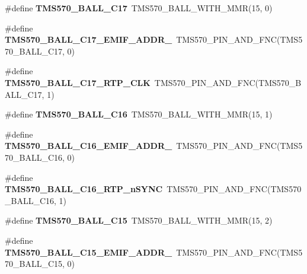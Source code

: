\begin{DoxyCompactItemize}
\#define {\bfseries T\+M\+S570\+\_\+\+B\+A\+L\+L\+\_\+\+C17}~T\+M\+S570\+\_\+\+B\+A\+L\+L\+\_\+\+W\+I\+T\+H\+\_\+\+M\+MR(15, 0)
\item 
\mbox{\label{tms570ls3137zwt-pins_8h_a05c4cd325eded595ce31f3a138ee33ba}} 
\#define {\bfseries T\+M\+S570\+\_\+\+B\+A\+L\+L\+\_\+\+C17\+\_\+\+E\+M\+I\+F\+\_\+\+A\+D\+D\+R\+\_}~T\+M\+S570\+\_\+\+P\+I\+N\+\_\+\+A\+N\+D\+\_\+\+F\+NC(T\+M\+S570\+\_\+\+B\+A\+L\+L\+\_\+\+C17, 0)
\item 
\mbox{\label{tms570ls3137zwt-pins_8h_a92a55b1169cb9770342a10d633434f7e}} 
\#define {\bfseries T\+M\+S570\+\_\+\+B\+A\+L\+L\+\_\+\+C17\+\_\+\+R\+T\+P\+\_\+\+C\+LK}~T\+M\+S570\+\_\+\+P\+I\+N\+\_\+\+A\+N\+D\+\_\+\+F\+NC(T\+M\+S570\+\_\+\+B\+A\+L\+L\+\_\+\+C17, 1)
\item 
\mbox{\label{tms570ls3137zwt-pins_8h_ac5b737fd92ff1bb7dd30a62441b8b2c8}} 
\#define {\bfseries T\+M\+S570\+\_\+\+B\+A\+L\+L\+\_\+\+C16}~T\+M\+S570\+\_\+\+B\+A\+L\+L\+\_\+\+W\+I\+T\+H\+\_\+\+M\+MR(15, 1)
\item 
\mbox{\label{tms570ls3137zwt-pins_8h_a2e968cb046ddf8fa6fc833d1b1882bf5}} 
\#define {\bfseries T\+M\+S570\+\_\+\+B\+A\+L\+L\+\_\+\+C16\+\_\+\+E\+M\+I\+F\+\_\+\+A\+D\+D\+R\+\_}~T\+M\+S570\+\_\+\+P\+I\+N\+\_\+\+A\+N\+D\+\_\+\+F\+NC(T\+M\+S570\+\_\+\+B\+A\+L\+L\+\_\+\+C16, 0)
\item 
\mbox{\label{tms570ls3137zwt-pins_8h_aebc369283ea73c425eb005f09729db75}} 
\#define {\bfseries T\+M\+S570\+\_\+\+B\+A\+L\+L\+\_\+\+C16\+\_\+\+R\+T\+P\+\_\+n\+S\+Y\+NC}~T\+M\+S570\+\_\+\+P\+I\+N\+\_\+\+A\+N\+D\+\_\+\+F\+NC(T\+M\+S570\+\_\+\+B\+A\+L\+L\+\_\+\+C16, 1)
\item 
\mbox{\label{tms570ls3137zwt-pins_8h_a3f1a39d84701cc2e8a44c9b2fc0c33dd}} 
\#define {\bfseries T\+M\+S570\+\_\+\+B\+A\+L\+L\+\_\+\+C15}~T\+M\+S570\+\_\+\+B\+A\+L\+L\+\_\+\+W\+I\+T\+H\+\_\+\+M\+MR(15, 2)
\item 
\mbox{\label{tms570ls3137zwt-pins_8h_a3ce8f2c75b443108578823520bae6f91}} 
\#define {\bfseries T\+M\+S570\+\_\+\+B\+A\+L\+L\+\_\+\+C15\+\_\+\+E\+M\+I\+F\+\_\+\+A\+D\+D\+R\+\_}~T\+M\+S570\+\_\+\+P\+I\+N\+\_\+\+A\+N\+D\+\_\+\+F\+NC(T\+M\+S570\+\_\+\+B\+A\+L\+L\+\_\+\+C15, 0)

\end{DoxyCompactItemize}
